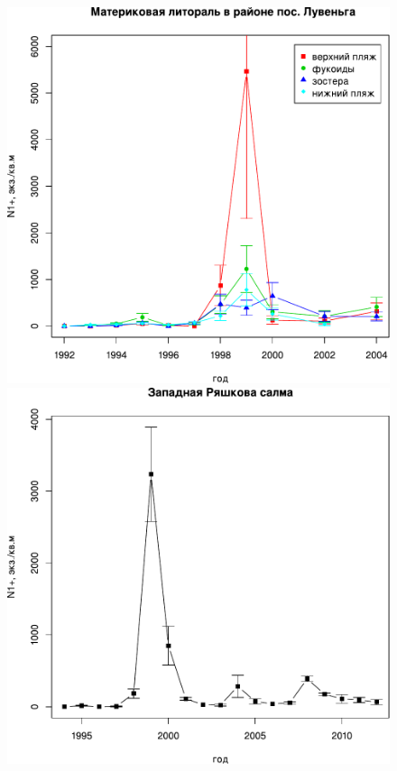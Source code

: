 \begin{figure}[p]
	\begin{minipage}[b]{.49\linewidth}
	\begin{center}
		\includegraphics[width=\linewidth]{../White_Sea/Luvenga_II_razrez/2razrez_N_oneyear1.pdf}
	\end{center}
	\end{minipage}
%
	\hfil %
%
	\begin{minipage}[b]{.49\linewidth}
	\begin{center}
		\includegraphics[width=\linewidth]{../White_Sea/Ryashkov_ZRS/ZRS_N_oneyear1.pdf}

\end{center}
\end{minipage}
\end{figure}
